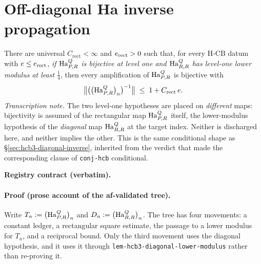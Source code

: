\section{Off-diagonal Ha inverse propagation}\label{sec:hcb3-offdiagonal-inverse}

\begin{lemma}\label{lem:hcb3-offdiagonal-inverse}
There are universal $C_{\mathrm{rect}}<\infty$ and $e_{\mathrm{rect}}>0$ such that,
for every H-CB datum with $e\le e_{\mathrm{rect}}$, \emph{if $\mathrm{Ha}^{Q}_{P,R}$ is
bijective at level one and $\mathrm{Ha}^{Q}_{R,R}$ has level-one lower modulus at least
$\tfrac14$}, then every amplification of $\mathrm{Ha}^{Q}_{P,R}$ is bijective with
\begin{equation}\label{eq:odi-main}
  \bigl\lVert\bigl(\bigl(\mathrm{Ha}^{Q}_{P,R}\bigr)_{n}\bigr)^{-1}\bigr\rVert\;\le\;1+C_{\mathrm{rect}}\,e .
\end{equation}
\emph{Transcription note.} The two level-one hypotheses are placed on \emph{different}
maps: bijectivity is assumed of the rectangular map $\mathrm{Ha}^{Q}_{P,R}$ itself, the
lower-modulus hypothesis of the \emph{diagonal} map $\mathrm{Ha}^{Q}_{R,R}$ at the target index.
Neither is discharged here, and neither implies the other. This is the same conditional
shape as \S\ref{sec:hcb3-diagonal-inverse}, inherited from the verdict that made the
corresponding clause of \texttt{conj-hcb} conditional.
\end{lemma}

\noindent\textbf{Registry contract (verbatim).}

\paragraph{Proof (prose account of the af-validated tree).}
Write $T_n:=\bigl(\mathrm{Ha}^{Q}_{P,R}\bigr)_{n}$ and $D_n:=\bigl(\mathrm{Ha}^{Q}_{R,R}\bigr)_{n}$. The tree has four movements:
a constant ledger, a rectangular square estimate, the passage to a lower modulus for
$T_n$, and a reciprocal bound. Only the third movement uses the diagonal hypothesis, and
it uses it through \texttt{lem-hcb3-diagonal-lower-modulus} rather than re-proving it.

